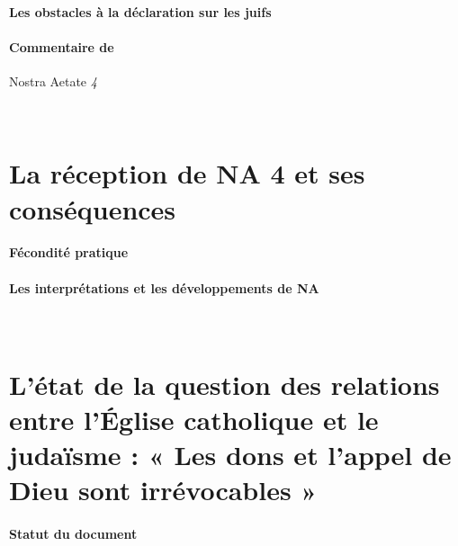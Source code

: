   
    
    \paragraph{Les obstacles à la déclaration sur les juifs}
    
  
    
    \paragraph{Commentaire de} Nostra Aetate \emph{4}
    
  
 ~
  \hypertarget{la-ruxe9ception-de-na-4-et-ses-consuxe9quences}{%
  \section{La réception de NA 4 et ses
  conséquences}\label{la-ruxe9ception-de-na-4-et-ses-consuxe9quences}}

  
  \def\labelenumii{\arabic{enumii}.}
  
    
    \paragraph{Fécondité pratique}
    
  
    
    \paragraph{Les interprétations et les développements de NA}
    
  
 ~
  \hypertarget{luxe9tat-de-la-question-des-relations-entre-luxe9glise-catholique-et-le-judauxefsme-les-dons-et-lappel-de-dieu-sont-irruxe9vocables}{%
  \section{L'état de la question des relations entre l'Église catholique
  et le judaïsme : « Les dons et l'appel de Dieu sont irrévocables
  »}\label{luxe9tat-de-la-question-des-relations-entre-luxe9glise-catholique-et-le-judauxefsme-les-dons-et-lappel-de-dieu-sont-irruxe9vocables}}

  
 
  
    
    \paragraph{Statut du document}
    
